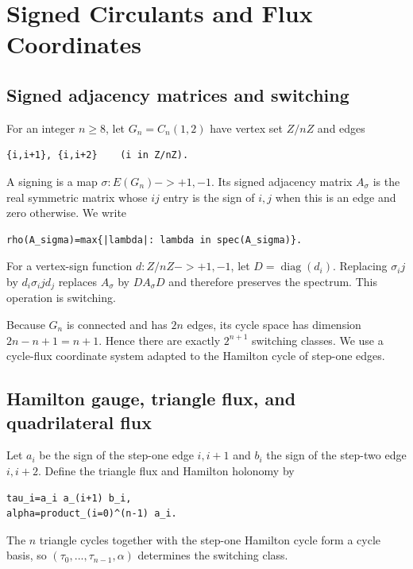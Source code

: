 \section{Signed Circulants and Flux Coordinates}

\subsection{Signed adjacency matrices and switching}

For an integer \(n\ge 8\), let \(G_n=C_n(1,2)\) have vertex set \(Z/nZ\) and edges

\begin{lstlisting}[language={}]
{i,i+1}, {i,i+2}    (i in Z/nZ).
\end{lstlisting}

A signing is a map \(\sigma:E(G_n)->{+1,-1}\). Its signed adjacency matrix
\(A_\sigma\) is the real symmetric matrix whose \(ij\) entry is the sign of
\({i,j}\) when this is an edge and zero otherwise. We write

\begin{lstlisting}[language={}]
rho(A_sigma)=max{|lambda|: lambda in spec(A_sigma)}.
\end{lstlisting}

For a vertex-sign function \(d:Z/nZ->{+1,-1}\), let \(D=\operatorname{diag}(d_i)\). Replacing
\(\sigma_ij\) by \(d_i \sigma_ij d_j\) replaces \(A_\sigma\) by \(D A_\sigma D\) and
therefore preserves the spectrum. This operation is switching.

Because \(G_n\) is connected and has \(2n\) edges, its cycle space has dimension
\(2n-n+1=n+1\). Hence there are exactly \(2^{n+1}\) switching classes. We use a
cycle-flux coordinate system adapted to the Hamilton cycle of step-one edges.

\subsection{Hamilton gauge, triangle flux, and quadrilateral flux}

Let \(a_i\) be the sign of the step-one edge \({i,i+1}\) and \(b_i\) the sign of
the step-two edge \({i,i+2}\). Define the triangle flux and Hamilton holonomy by

\begin{lstlisting}[language={}]
tau_i=a_i a_(i+1) b_i,
alpha=product_(i=0)^(n-1) a_i.
\end{lstlisting}

The \(n\) triangle cycles together with the step-one Hamilton cycle form a cycle
basis, so \((\tau_0,...,\tau_{n-1},\alpha)\) determines the switching class.

